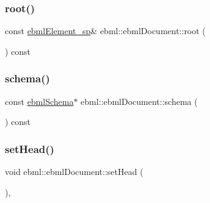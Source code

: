 \mbox{\label{classebml_1_1ebmlDocument_a012478219e8197111084ba55dc0586a5}} 
\subsubsection{\texorpdfstring{root()}{root()}}
{\footnotesize\ttfamily const \mbox{\hyperlink{namespaceebml_adad533b7705a16bb360fe56380c5e7be}{ebml\+Element\+\_\+sp}}\& ebml\+::ebml\+Document\+::root (\begin{DoxyParamCaption}{ }\end{DoxyParamCaption}) const}

\mbox{\label{classebml_1_1ebmlDocument_aff3d1abece0a2bedf5a90e6af0ff3ddd}} 
\subsubsection{\texorpdfstring{schema()}{schema()}}
{\footnotesize\ttfamily const \mbox{\hyperlink{classebml_1_1ebmlSchema}{ebml\+Schema}}$\ast$ ebml\+::ebml\+Document\+::schema (\begin{DoxyParamCaption}{ }\end{DoxyParamCaption}) const}

\mbox{\label{classebml_1_1ebmlDocument_ad61feb3fb9966a0b3b9d2f5f5cdd4dd0}} 
\subsubsection{\texorpdfstring{set\+Head()}{setHead()}\hspace{0.1cm}{\footnotesize\ttfamily [1/2]}}
{\footnotesize\ttfamily void ebml\+::ebml\+Document\+::set\+Head (\begin{DoxyParamCaption}\item[{const \mbox{\hyperlink{namespaceebml_adad533b7705a16bb360fe56380c5e7be}{ebml\+Element\+\_\+sp}} \&}]{ }\end{DoxyParamCaption})\hspace{0.3cm}{\ttfamily [inline]}, {\ttfamily [protected]}}

